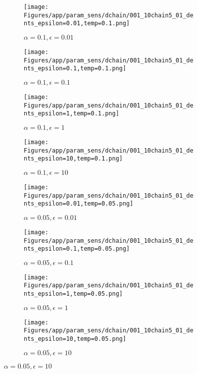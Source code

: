 \documentclass{article}
\theoremstyle{plain}
\begin{document}
\begin{appendices}
\begin{figure}
                \begin{subfigure}[b]{0.24\textwidth}
                    \centering
                    \texttt{[image: Figures/app/param\_sens/dchain/001\_10chain5\_01\_dents\_epsilon=0.01,temp=0.1.png]}
                    \caption*{$\alpha=0.1,\epsilon=0.01$}
                \end{subfigure}
                \begin{subfigure}[b]{0.24\textwidth}
                    \centering
                    \texttt{[image: Figures/app/param\_sens/dchain/001\_10chain5\_01\_dents\_epsilon=0.1,temp=0.1.png]}
                    \caption*{$\alpha=0.1,\epsilon=0.1$}
                \end{subfigure}
                \begin{subfigure}[b]{0.24\textwidth}
                    \centering
                    \texttt{[image: Figures/app/param\_sens/dchain/001\_10chain5\_01\_dents\_epsilon=1,temp=0.1.png]}
                    \caption*{$\alpha=0.1,\epsilon=1$}
                \end{subfigure}
                \begin{subfigure}[b]{0.24\textwidth}
                    \centering
                    \texttt{[image: Figures/app/param\_sens/dchain/001\_10chain5\_01\_dents\_epsilon=10,temp=0.1.png]}
                    \caption*{$\alpha=0.1,\epsilon=10$}
                \end{subfigure}
                
                \begin{subfigure}[b]{0.24\textwidth}
                    \centering
                    \texttt{[image: Figures/app/param\_sens/dchain/001\_10chain5\_01\_dents\_epsilon=0.01,temp=0.05.png]}
                    \caption*{$\alpha=0.05,\epsilon=0.01$}
                \end{subfigure}
                \begin{subfigure}[b]{0.24\textwidth}
                    \centering
                    \texttt{[image: Figures/app/param\_sens/dchain/001\_10chain5\_01\_dents\_epsilon=0.1,temp=0.05.png]}
                    \caption*{$\alpha=0.05,\epsilon=0.1$}
                \end{subfigure}
                \begin{subfigure}[b]{0.24\textwidth}
                    \centering
                    \texttt{[image: Figures/app/param\_sens/dchain/001\_10chain5\_01\_dents\_epsilon=1,temp=0.05.png]}
                    \caption*{$\alpha=0.05,\epsilon=1$}
                \end{subfigure}
                \begin{subfigure}[b]{0.24\textwidth}
                    \centering
                    \texttt{[image: Figures/app/param\_sens/dchain/001\_10chain5\_01\_dents\_epsilon=10,temp=0.05.png]}
                    \caption*{$\alpha=0.05,\epsilon=10$}
                \end{subfigure}
                

\end{figure}
\end{appendices}
\end{document}
